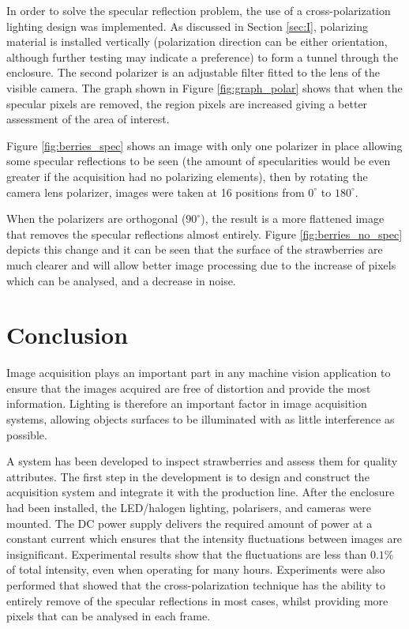 \documentclass[fleqn,twoside,12pt]{report}
\begin{document}
In order to solve the specular reflection problem, the use of a cross-polarization lighting design was implemented. As discussed in Section \ref{sec:I}, polarizing material is installed vertically (polarization direction can be either orientation, although further testing may indicate a preference) to form a tunnel through the enclosure. The second polarizer is an adjustable filter fitted to the lens of the visible camera. The graph shown in Figure \ref{fig:graph_polar} shows that when the specular pixels are removed, the region pixels are increased giving a better assessment of the area of interest.



Figure \ref{fig:berries_spec} shows an image with only one polarizer in place allowing some specular reflections to be seen (the amount of specularities would be even greater if the acquisition had no polarizing elements), then by rotating the camera lens polarizer, images were taken at 16 positions from $0^{\circ}$ to $180^{\circ}$.  


When the polarizers are orthogonal ($90^{\circ}$), the result is a more flattened image that removes the specular reflections almost entirely.  Figure \ref{fig:berries_no_spec} depicts this change and it can be seen that the surface of the strawberries are much clearer and will allow better image processing due to the increase of pixels which can be analysed, and a decrease in noise. 



\section{Conclusion}

Image acquisition plays an important part in any machine vision application to ensure that the images acquired are free of distortion and provide the most information. Lighting is therefore an important factor in image acquisition systems, allowing objects surfaces to be illuminated with as little interference as possible.

A system has been developed to inspect strawberries and assess them for quality attributes. The first step in the development is to design and construct the acquisition system and integrate it with the production line. After the enclosure had been installed, the LED/halogen lighting, polarisers, and cameras were mounted. The DC power supply delivers the required amount of power at a constant current which ensures that the intensity fluctuations between images are insignificant. Experimental results show that the fluctuations are less than $0.1\%$ of total intensity, even when operating for many hours. Experiments were also performed that showed that the cross-polarization technique has the ability to entirely remove of the specular reflections in most cases, whilst providing more pixels that can be analysed in each frame.  
\end{document}
